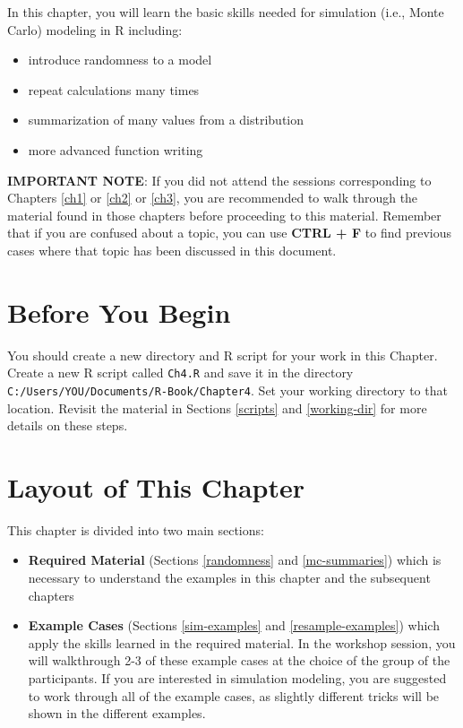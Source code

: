\documentclass[]{book}
\providecommand{\tightlist}{%
  \setlength{\itemsep}{0pt}\setlength{\parskip}{0pt}}
\theoremstyle{definition}
\theoremstyle{definition}
\theoremstyle{definition}
\theoremstyle{remark}
\begin{document}
In this chapter, you will learn the basic skills needed for simulation
(i.e., Monte Carlo) modeling in R including:

\begin{itemize}
\tightlist
\item
  introduce randomness to a model
\item
  repeat calculations many times
\item
  summarization of many values from a distribution
\item
  more advanced function writing
\end{itemize}

\textbf{IMPORTANT NOTE}: If you did not attend the sessions
corresponding to Chapters \ref{ch1} or \ref{ch2} or \ref{ch3}, you are
recommended to walk through the material found in those chapters before
proceeding to this material. Remember that if you are confused about a
topic, you can use \textbf{CTRL + F} to find previous cases where that
topic has been discussed in this document.

\section*{Before You Begin}\label{before-you-begin-2}

You should create a new directory and R script for your work in this
Chapter. Create a new R script called \texttt{Ch4.R} and save it in the
directory \texttt{C:/Users/YOU/Documents/R-Book/Chapter4}. Set your
working directory to that location. Revisit the material in Sections
\ref{scripts} and \ref{working-dir} for more details on these steps.

\section*{Layout of This Chapter}\label{layout-of-this-chapter}

This chapter is divided into two main sections:

\begin{itemize}
\item
  \textbf{Required Material} (Sections \ref{randomness} and
  \ref{mc-summaries}) which is necessary to understand the examples in
  this chapter and the subsequent chapters
\item
  \textbf{Example Cases} (Sections \ref{sim-examples} and
  \ref{resample-examples}) which apply the skills learned in the
  required material. In the workshop session, you will walkthrough 2-3
  of these example cases at the choice of the group of the participants.
  If you are interested in simulation modeling, you are suggested to
  work through all of the example cases, as slightly different tricks
  will be shown in the different examples.
\end{itemize}
\end{document}
